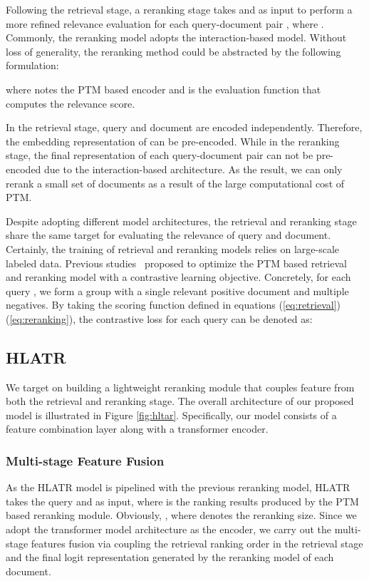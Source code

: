 \documentclass[11pt]{article}
\begin{document}
Following the retrieval stage, a reranking stage takes  and  as input to perform a more refined relevance evaluation for each query-document pair , where . Commonly, the reranking model adopts the interaction-based model. Without loss of generality, the reranking method could be abstracted by the following formulation:

where  notes the PTM based encoder and  is the evaluation function that computes the relevance score. 

In the retrieval stage, query and document are encoded independently. Therefore, the embedding representation of  can be pre-encoded. While in the reranking stage, the final representation of each query-document pair can not be pre-encoded due to the interaction-based architecture. As the result, we can only rerank a small set of documents as a result of the large computational cost of PTM. 

Despite adopting different model architectures, the retrieval and reranking stage share the same target for evaluating the relevance of query and document. Certainly, the training of retrieval and reranking models relies on large-scale labeled data. Previous studies~\cite{karpukhin2020dense,gao2021rethink} proposed to optimize the PTM based retrieval and reranking model with a contrastive learning objective. Concretely, for each query , we form a group  with a single relevant positive document  and multiple negatives. By taking the scoring function defined in equations (\ref{eq:retrieval})(\ref{eq:reranking}), the contrastive loss for each query  can be denoted as:




\subsection{HLATR}
We target on building a lightweight reranking module that couples feature from both the retrieval and reranking stage. The overall architecture of our proposed model is illustrated in Figure \ref{fig:hltar}. Specifically, our model consists of a feature combination layer along with a transformer encoder. 

\subsubsection{Multi-stage Feature Fusion}
As the HLATR model is pipelined with the previous reranking model, HLATR takes the query  and  as input, where  is the ranking results produced by the PTM based reranking module. Obviously, , where  denotes the reranking size. Since we adopt the transformer model architecture as the encoder, we carry out the multi-stage features fusion via coupling the retrieval ranking order in the retrieval stage and the final logit representation generated by the reranking model of each document.
\end{document}
